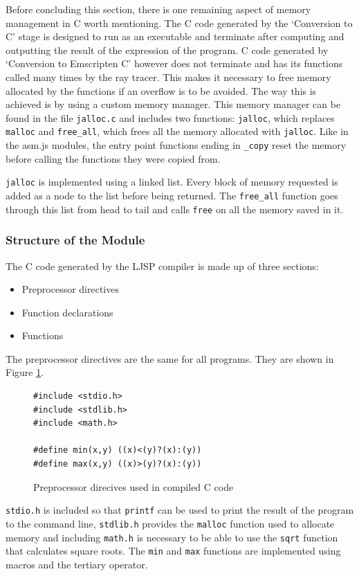 \documentclass[11pt]{report}
\begin{document}
Before concluding this section, there is one remaining aspect of memory management in C worth mentioning. The C code generated by the `Conversion to C' stage is designed to run as an executable and terminate after computing and outputting the result of the expression of the program. C code generated by `Conversion to Emscripten C' however does not terminate and has its functions called many times by the ray tracer. This makes it necessary to free memory allocated by the functions if an overflow is to be avoided. The way this is achieved is by using a custom memory manager. This memory manager can be found in the file \texttt{jalloc.c} and includes two functions: \texttt{jalloc}, which replaces \texttt{malloc} and \texttt{free_all}, which frees all the memory allocated with \texttt{jalloc}. Like in the asm.js modules, the entry point functions ending in \texttt{_copy} reset the memory before calling the functions they were copied from.

\texttt{jalloc} is implemented using a linked list. Every block of memory requested is added as a node to the list before being returned. The \texttt{free_all} function goes through this list from head to tail and calls \texttt{free} on all the memory saved in it.

\subsubsection{Structure of the Module}
The C code generated by the LJSP compiler is made up of three sections:
\begin{itemize}
\item Preprocessor directives
\item Function declarations
\item Functions
\end{itemize}

The preprocessor directives are the same for all programs. They are shown in Figure \ref{icmm4}.

\begin{figure}[ht]
\begin{lstlisting}
#include <stdio.h>
#include <stdlib.h>
#include <math.h>
    
#define min(x,y) ((x)<(y)?(x):(y))
#define max(x,y) ((x)>(y)?(x):(y))
\end{lstlisting}
\caption{Preprocessor direcives used in compiled C code}
\label{icmm4}
\end{figure}

\texttt{stdio.h} is included so that \texttt{printf} can be used to print the result of the program to the command line, \texttt{stdlib.h} provides the \texttt{malloc} function used to allocate memory and including \texttt{math.h} is necessary to be able to use the \texttt{sqrt} function that calculates square roots. The \texttt{min} and \texttt{max} functions are implemented using macros and the tertiary operator.
\end{document}
